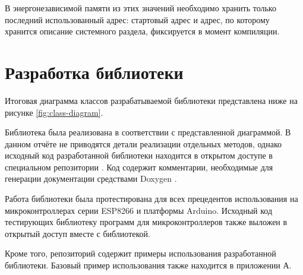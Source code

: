 В энергонезависимой памяти из этих значений необходимо хранить только последний использованный адрес: стартовый адрес и адрес, по которому хранится описание системного раздела, фиксируется в момент компиляции.

\section{Разработка библиотеки}

Итоговая диаграмма классов разрабатываемой библиотеки представлена ниже на рисунке \ref{fig:class-diagram}.



Библиотека была реализована в соответствии с представленной диаграммой.
В данном отчёте не приводятся детали реализации отдельных методов, однако исходный код разработанной библиотеки находится в открытом доступе в специальном репозитории \cite{web:my-eemanager}.
Код содержит комментарии, необходимые для генерации документации средствами Doxygen \cite{web:doxygen}.

Работа библиотеки была протестирована для всех прецедентов использования на микроконтроллерах серии ESP8266 и платформы Arduino.
Исходный код тестирующих библиотеку программ для микроконтроллеров также выложен в открытый доступ вместе с библиотекой.

Кроме того, репозиторий содержит примеры использования разработанной библиотеки.
Базовый пример использования также находится в приложении А.
